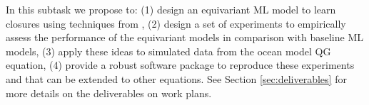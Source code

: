 \documentclass[11pt]{article}
\begin{document}
In this subtask we propose to:
(1) design an equivariant ML model to learn closures using techniques from \cite{villar2021scalars, xu2022pde}, (2) design a set of experiments to empirically assess the performance of the equivariant models in comparison with baseline ML models, (3) apply these ideas to simulated data from the ocean model QG equation, (4) provide a robust software package to reproduce these experiments and that can be extended to other equations.
See Section \ref{sec:deliverables} for more details on the deliverables on work plans. 

\end{document}
